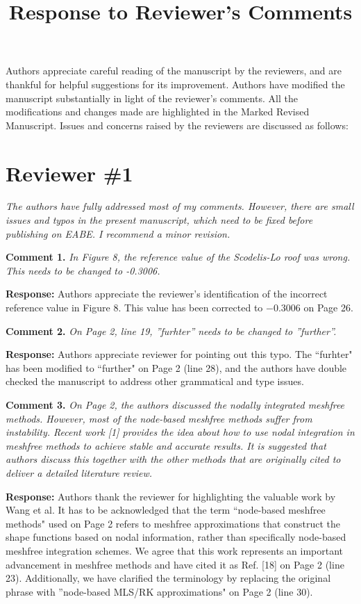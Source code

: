 \documentclass{article}
\title{Response to Reviewer's Comments}
\author{}
\date{}
\begin{document}
\maketitle

Authors appreciate careful reading of the manuscript by the reviewers, and are thankful for helpful suggestions for its improvement. Authors have modified the manuscript substantially in light of the reviewer's comments. All the modifications and changes made are highlighted in the Marked Revised Manuscript. Issues and concerns raised by the reviewers are discussed as follows:

\section*{Reviewer \#1}
\textit{The authors have fully addressed most of my comments. However, there are small issues and typos in the present manuscript, which need to be fixed before publishing on EABE. I recommend a minor revision.}

\textbf{Comment 1.} \textit{In Figure 8, the reference value of the Scodelis-Lo roof was wrong. This needs to be changed to -0.3006.}

\textbf{Response:} Authors appreciate the reviewer's identification of the incorrect reference value in Figure 8. This value has been corrected to $-0.3006$ on Page 26.

\textbf{Comment 2.} \textit{On Page 2, line 19, ”furhter” needs to be changed to ”further”.}

\textbf{Response:} Authors appreciate reviewer for pointing out this typo. The ``furhter" has been modified to ``further" on Page 2 (line 28), and the authors have double checked the manuscript to address other grammatical and type issues.

\textbf{Comment 3.} \textit{On Page 2, the authors discussed the nodally integrated meshfree methods. However, most of the node-based meshfree methods suffer from instability. Recent work [1] provides the idea about how to use nodal integration in meshfree methods to achieve stable and accurate results. It is suggested that authors discuss this together with the other methods that are originally cited to deliver a detailed literature review.}


\textbf{Response:} Authors thank the reviewer for highlighting the valuable work by Wang et al. It has to be acknowledged that the term ``node-based meshfree methods" used on Page 2 refers to meshfree approximations that construct the shape functions based on nodal information, rather than specifically node-based meshfree integration schemes. 
We agree that this work represents an important advancement in meshfree methods and have cited it as Ref. [18] on Page 2 (line 23). 
Additionally, we have clarified the terminology by replacing the original phrase with ''node-based MLS/RK approximations" on Page 2 (line 30).
\end{document}
